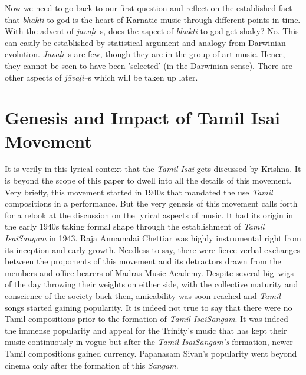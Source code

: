 Now we need to go back to our first question and reflect on the established fact that \textit{bhakti} to god is the heart of Karnatic music through different points in time. With the advent of \textit{jāvaḷi–}s, does the aspect of \textit{bhakti} to god get shaky? No. This can easily be established by statistical argument and analogy from Darwinian evolution. \textit{Jāvaḷi}–s are few, though they are in the group of art music. Hence, they cannot be seen to have been 'selected' (in the Darwinian sense). There are other aspects of \textit{jāvaḷi–}s which will be taken up later.


\section*{Genesis and Impact of Tamil Isai Movement}

It is verily in this lyrical context that the \textit{Tamil Isai} gets discussed by Krishna. It is beyond the scope of this paper to dwell into all the details of this movement. Very briefly, this movement started in 1940s that mandated the use \textit{Tamil} compositions in a performance. But the very genesis of this movement calls forth for a relook at the discussion on the lyrical aspects of music. It had its origin in the early 1940s taking formal shape through the establishment of \textit{Tamil IsaiSangam} in 1943. Raja Annamalai Chettiar was highly instrumental right from its inception and early growth. Needless to say, there were fierce verbal exchanges between the proponents of this movement and its detractors drawn from the members and office bearers of Madras Music Academy. Despite several big–wigs of the day throwing their weights on either side, with the collective maturity and conscience of the society back then, amicability was soon reached and \textit{Tamil} songs started gaining popularity. It is indeed not true to say that there were no Tamil compositions prior to the formation of \textit{Tamil IsaiSangam}. It was indeed the immense popularity and appeal for the Trinity’s music that has kept their music continuously in vogue but after the \textit{Tamil IsaiSangam’s} formation, newer Tamil compositions gained currency. Papanasam Sivan’s popularity went beyond cinema only after the formation of this \textit{Sangam}.

